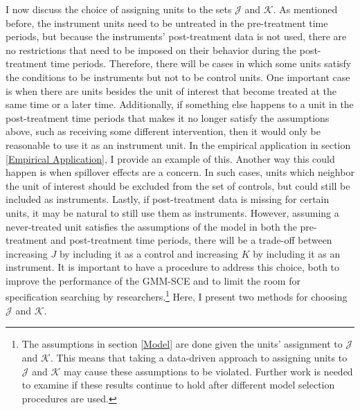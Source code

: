 \documentclass{article}
\begin{document}
I now discuss the choice of assigning units to the sets $\mathcal{J}$ and $\mathcal{K}$. As mentioned before, the instrument units need to be untreated in the pre-treatment time periods, but because the instruments' post-treatment data is not used, there are no restrictions that need to be imposed on their behavior during the post-treatment time periods. Therefore, there will be cases in which some units satisfy the conditions to be instruments but not to be control units. One important case is when there are units besides the unit of interest that become treated at the same time or a later time. Additionally, if something else happens to a unit in the post-treatment time periods that makes it no longer satisfy the assumptions above, such as receiving some different intervention, then it would only be reasonable to use it as an instrument unit. In the empirical application in section \ref{Empirical Application}, I provide an example of this. Another way this could happen is when spillover effects are a concern. In such cases, units which neighbor the unit of interest should be excluded from the set of controls, but could still be included as instruments. Lastly, if post-treatment data is missing for certain units, it may be natural to still use them as instruments. However, assuming a never-treated unit satisfies the assumptions of the model in both the pre-treatment and post-treatment time periods, there will be a trade-off between increasing $J$ by including it as a control and increasing $K$ by including it as an instrument. It is important to have a procedure to address this choice, both to improve the performance of the GMM-SCE and to limit the room for specification searching by researchers.\footnote{The assumptions in section \ref{Model} are done given the units' assignment to $\mathcal{J}$ and $\mathcal{K}$. This means that taking a data-driven approach to assigning units to $\mathcal{J}$ and $\mathcal{K}$ may cause these assumptions to be violated. Further work is needed to examine if these results continue to hold after different model selection procedures are used.} Here, I present two methods for choosing $\mathcal{J}$ and $\mathcal{K}$.
\par
\end{document}
